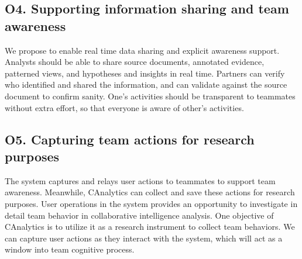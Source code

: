 \subsection{O4. Supporting information sharing and team awareness}
We propose to enable real time data sharing and explicit awareness support. Analysts should be able to share source documents, annotated evidence, patterned views, and hypotheses and insights in real time. Partners can verify who identified and shared the information, and can validate against the source document to confirm sanity. One’s activities should be transparent to teammates without extra effort, so that everyone is aware of other’s activities. 
\subsection{O5. Capturing team actions for research purposes}
The system captures and relays user actions to teammates to support team awareness. Meanwhile, CAnalytics can collect and save these actions for research purposes. User operations in the system provides an opportunity to investigate in detail team behavior in collaborative intelligence analysis. One objective of CAnalytics is to utilize it as a research instrument to collect team behaviors. We can capture user actions as they interact with the system, which will act as a window into team cognitive process. 
